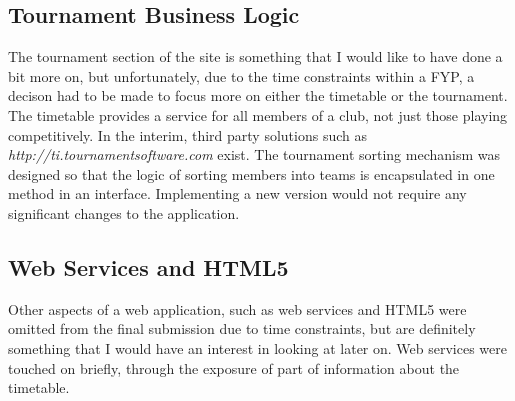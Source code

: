 \subsection{Tournament Business Logic}

The tournament section of the site is something that I would like to have done a bit more on, but unfortunately, due to the time constraints within a FYP, a decison had to be made to focus more on either the timetable or the tournament. The timetable provides a service for all members of a club, not just those playing competitively. In the interim, third party solutions such as \textit{http://ti.tournamentsoftware.com} exist. The tournament sorting mechanism was designed so that the logic of sorting members into teams is encapsulated in one method in an interface. Implementing a new version would not require any significant changes to the application. 

\subsection{Web Services and HTML5}
Other aspects of a web application, such as web services and HTML5 were omitted from the final submission due to time constraints, but are definitely something that I would have an interest in looking at later on. Web services were touched on briefly, through the exposure of part of information about the timetable. 